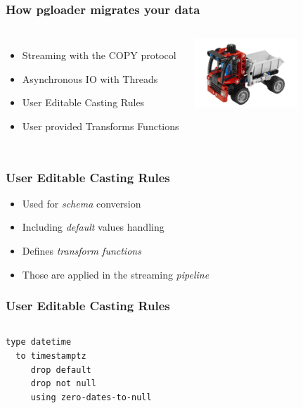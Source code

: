 \documentclass{beamer}
\begin{document}
\begin{frame}[fragile]
  \frametitle{How pgloader migrates your data}
  
  \vfill

\begin{columns}

  \begin{itemize}
  \item Streaming with the COPY protocol
  \item Asynchronous IO with Threads
  \item User Editable Casting Rules
  \item User provided Transforms Functions
  \end{itemize}  

\begin{center}
  \includegraphics[height=7em]{toy-loader.jpg}
\end{center}
\end{columns}
\end{frame}

\begin{frame}[fragile]
  \frametitle{User Editable Casting Rules}
  
  \vfill

  \begin{itemize}
  \item Used for \textit{schema} conversion
  \item Including \textit{default} values handling
  \item Defines \textit{transform functions}
  \item Those are applied in the streaming \textit{pipeline}
  \end{itemize}
\end{frame}

\begin{frame}[fragile]
  \frametitle{User Editable Casting Rules}
  
  \vfill

\begin{columns}[c]
\begin{verbatim}
type datetime
  to timestamptz
     drop default
     drop not null
     using zero-dates-to-null
\end{verbatim}
\end{columns}
\end{frame}
\end{document}
